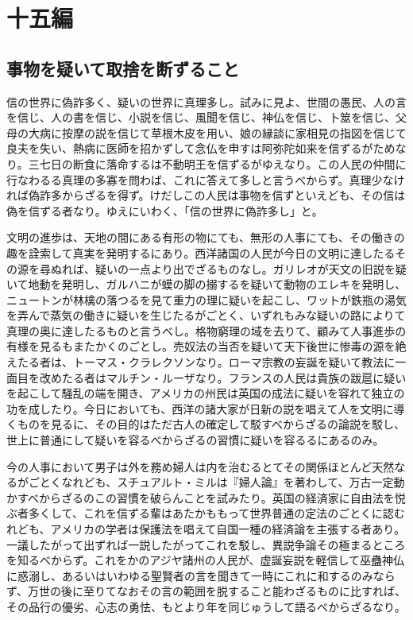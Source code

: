 \documentclass[a4paper, platex, dvipdfmx]{jsarticle}
\begin{document}
\section{十五編}
\subsection{事物を疑いて取捨を断ずること}
信の世界に偽詐多く、疑いの世界に真理多し。試みに見よ、世間の愚民、人の言を信じ、人の書を信じ、小説を信じ、風聞を信じ、神仏を信じ、卜筮を信じ、父母の大病に按摩の説を信じて草根木皮を用い、娘の縁談に家相見の指図を信じて良夫を失い、熱病に医師を招かずして念仏を申すは阿弥陀如来を信ずるがためなり。三七日の断食に落命するは不動明王を信ずるがゆえなり。この人民の仲間に行なわるる真理の多寡を問わば、これに答えて多しと言うべからず。真理少なければ偽詐多からざるを得ず。けだしこの人民は事物を信ずといえども、その信は偽を信ずる者なり。ゆえにいわく、「信の世界に偽詐多し」と。

文明の進歩は、天地の間にある有形の物にても、無形の人事にても、その働きの趣を詮索して真実を発明するにあり。西洋諸国の人民が今日の文明に達したるその源を尋ぬれば、疑いの一点より出でざるものなし。ガリレオが天文の旧説を疑いて地動を発明し、ガルハニが蟆の脚の搦するを疑いて動物のエレキを発明し、ニュートンが林檎の落つるを見て重力の理に疑いを起こし、ワットが鉄瓶の湯気を弄んで蒸気の働きに疑いを生じたるがごとく、いずれもみな疑いの路によりて真理の奥に達したるものと言うべし。格物窮理の域を去りて、顧みて人事進歩の有様を見るもまたかくのごとし。売奴法の当否を疑いて天下後世に惨毒の源を絶えたる者は、トーマス・クラレクソンなり。ローマ宗教の妄誕を疑いて教法に一面目を改めたる者はマルチン・ルーザなり。フランスの人民は貴族の跋扈に疑いを起こして騒乱の端を開き、アメリカの州民は英国の成法に疑いを容れて独立の功を成したり。今日においても、西洋の諸大家が日新の説を唱えて人を文明に導くものを見るに、その目的はただ古人の確定して駁すべからざるの論説を駁し、世上に普通にして疑いを容るべからざるの習慣に疑いを容るるにあるのみ。

今の人事において男子は外を務め婦人は内を治むるとてその関係ほとんど天然なるがごとくなれども、スチュアルト・ミルは『婦人論』を著わして、万古一定動かすべからざるのこの習慣を破らんことを試みたり。英国の経済家に自由法を悦ぶ者多くして、これを信ずる輩はあたかももって世界普通の定法のごとくに認むれども、アメリカの学者は保護法を唱えて自国一種の経済論を主張する者あり。一議したがって出ずれば一説したがってこれを駁し、異説争論その極まるところを知るべからず。これをかのアジヤ諸州の人民が、虚誕妄説を軽信して巫蠱神仏に惑溺し、あるいはいわゆる聖賢者の言を聞きて一時にこれに和するのみならず、万世の後に至りてなおその言の範囲を脱すること能わざるものに比すれば、その品行の優劣、心志の勇怯、もとより年を同じゅうして語るべからざるなり。
\end{document}
